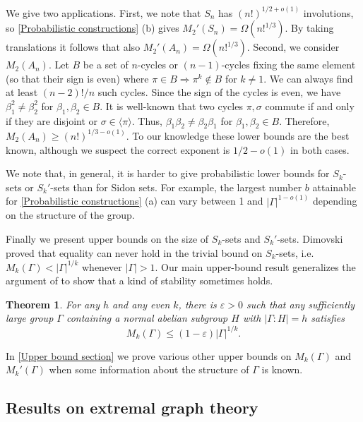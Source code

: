 \documentclass[12pt]{article}
\newcommand\lb{\langle}
\newcommand\rb{\rangle}
\newtheorem{thm}{Theorem}
\begin{document}
We give two applications. First, we note that $S_n$ has $(n!)^{1/2+o(1)}$ involutions, so \autoref{Probabilistic constructions} (b) gives $M_2'(S_n)=\Omega(n!^{1/3})$. By taking translations it follows that also $M_2'(A_n)=\Omega(n!^{1/3})$. Second, we consider $M_2(A_n)$. Let $B$ be a set of $n$-cycles or $(n-1)$-cycles fixing the same element (so that their sign is even) where $\pi\in B\Longrightarrow\pi^k\not\in B$ for $k\ne 1$. We can always find at least $(n-2)!/n$ such cycles. Since the sign of the cycles is even, we have $\beta_1^2\ne\beta_2^2$ for $\beta_1,\beta_2\in B$. It is well-known that two cycles $\pi,\sigma$ commute if and only if they are disjoint or $\sigma\in\lb\pi\rb$. Thus, $\beta_1\beta_2\ne\beta_2\beta_1$ for $\beta_1,\beta_2\in B$. Therefore, $M_2(A_n)\ge(n!)^{1/3-o(1)}$. To our knowledge these lower bounds are the best known, although we suspect the correct exponent is $1/2-o(1)$ in both cases.

We note that, in general, it is harder to give probabilistic lower bounds for $S_k$-sets or $S_k'$-sets than for Sidon sets. For example, the largest number $b$ attainable for \autoref{Probabilistic constructions} (a) can vary between 1 and $|\Gamma|^{1-o(1)}$ depending on the structure of the group. 

Finally we present upper bounds on the size of $S_k$-sets and $S_k'$-sets. Dimovski \cite{dimovski1992groups} proved that equality can never hold in the trivial bound on $S_k$-sets, i.e. $M_k(\Gamma)<|\Gamma|^{1/k}$
whenever $|\Gamma|>1$. Our main upper-bound result generalizes the argument of \cite{dimovski1992groups} to show that a kind of stability sometimes holds.

\begin{thm} \label{Sk upper bound}
    For any $h$ and any even $k$, there is $\varepsilon>0$ such that any sufficiently large group $\Gamma$ containing a normal abelian subgroup $H$ with $|\Gamma:H|=h$ satisfies
    $$M_k(\Gamma)\le(1-\varepsilon)|\Gamma|^{1/k}.$$
\end{thm}

In \autoref{Upper bound section} we prove various other upper bounds on $M_k(\Gamma)$ and $M_k'(\Gamma)$ when some information about the structure of $\Gamma$ is known.

\subsection{Results on extremal graph theory} \label{Subsection extremal graph theory}
\end{document}
